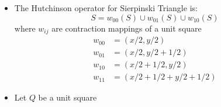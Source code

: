 \documentclass{beamer}
\begin{document}
\begin{frame}
    \begin{itemize}
    \item The Hutchinson operator for Sierpinski Triangle is:
    \begin{equation*}
        S = w_{00}(S) \cup w_{01}(S) \cup w_{10}(S)
    \end{equation*}
    where $w_{ij}$ are contraction mappings of a unit square
    \begin{align*}
        w_{00} &= (x/2,y/2)\\
        w_{01} &= (x/2, y/2+1/2) \\
        w_{10} &= (x/2 + 1/2, y/2) \\
        w_{11} &= (x/2 + 1/2 + y/2 + 1/2)
    \end{align*}
    \item Let $Q$ be a unit square  
    \end{itemize}
\end{frame}
\end{document}
